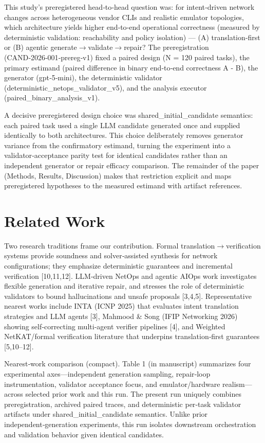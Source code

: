 \documentclass[conference]{IEEEtran}
\begin{document}
This study's preregistered head‑to‑head question was: for intent‑driven network changes across heterogeneous vendor CLIs and realistic emulator topologies, which architecture yields higher end‑to‑end operational correctness (measured by deterministic validation: reachability and policy isolation) --- (A) translation‑first or (B) agentic generate\ensuremath{\rightarrow}validate\ensuremath{\rightarrow}repair? The preregistration (CAND‑2026‑001‑prereg‑v1) fixed a paired design (N = 120 paired tasks), the primary estimand (paired difference in binary end‑to‑end correctness A - B), the generator (gpt‑5‑mini), the deterministic validator (deterministic\_netops\_validator\_v5), and the analysis executor (paired\_binary\_analysis\_v1).

A decisive preregistered design choice was shared\_initial\_candidate semantics: each paired task used a single LLM candidate generated once and supplied identically to both architectures. This choice deliberately removes generator variance from the confirmatory estimand, turning the experiment into a validator‑acceptance parity test for identical candidates rather than an independent generator or repair efficacy comparison. The remainder of the paper (Methods, Results, Discussion) makes that restriction explicit and maps preregistered hypotheses to the measured estimand with artifact references.

\section{Related Work}
Two research traditions frame our contribution. Formal translation\ensuremath{\rightarrow}verification systems provide soundness and solver‑assisted synthesis for network configurations; they emphasize deterministic guarantees and incremental verification [10,11,12]. LLM‑driven NetOps and agentic AIOps work investigates flexible generation and iterative repair, and stresses the role of deterministic validators to bound hallucinations and unsafe proposals [3,4,5]. Representative nearest works include INTA (ICNP 2025) that evaluates intent translation strategies and LLM agents [3], Mahmood \& Song (IFIP Networking 2026) showing self‑correcting multi‑agent verifier pipelines [4], and Weighted NetKAT/formal verification literature that underpins translation‑first guarantees [5,10--12].

Nearest‑work comparison (compact). Table 1 (in manuscript) summarizes four experimental axes---independent generation sampling, repair‑loop instrumentation, validator acceptance focus, and emulator/hardware realism---across selected prior work and this run. The present run uniquely combines preregistration, archived paired traces, and deterministic per‑task validator artifacts under shared\_initial\_candidate semantics. Unlike prior independent‑generation experiments, this run isolates downstream orchestration and validation behavior given identical candidates.
\end{document}
